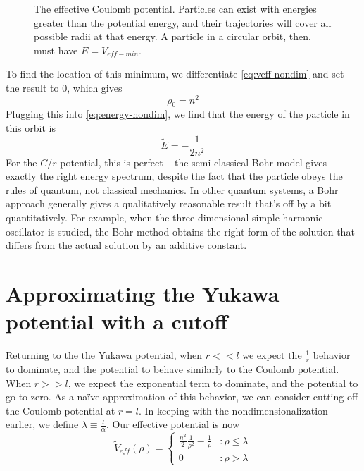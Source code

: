 \documentclass[12pt,twoside]{reedthesis}
\newcommand{\eqn}[1]{\begin{equation}#1\end{equation}}
\begin{document}
\begin{figure}[h]
\caption{The effective Coulomb potential. Particles can exist with energies greater than the potential energy, and their trajectories will cover all possible radii at that energy. A particle in a circular orbit, then, must have $E = V_{eff-min}$.}
\label{fig:hveff}
\end{figure}

To find the location of this minimum, we differentiate \eqref{eq:veff-nondim} and set the result to $0$, which gives
\eqn{
\rho_0 = n^2
\label{eq:rho-n}
}
Plugging this into \eqref{eq:energy-nondim}, we find that the energy of the particle in this orbit is
\eqn{
\tilde{E} = -\frac{1}{2 n^2}
}
For the $C/r$ potential, this is perfect -- the semi-classical Bohr model gives exactly the right energy spectrum, despite the fact that the particle obeys the rules of quantum, not classical mechanics. In other quantum systems, a Bohr approach generally gives a qualitatively reasonable result that's off by a bit quantitatively. For example, when the three-dimensional simple harmonic oscillator is studied, the Bohr method obtains the right form of the solution that differs from the actual solution by an additive constant.

\section{Approximating the Yukawa potential with a cutoff}

Returning to the the Yukawa potential, when $r << l$ we expect the $\frac{1}{r}$ behavior to dominate, and the potential to behave similarly to the Coulomb potential. When $r >> l$, we expect the exponential term to dominate, and the potential to go to zero. As a na\"ive approximation of this behavior, we can consider cutting off the Coulomb potential at $r = l$. In keeping with the nondimensionalization earlier, we define $\lambda \equiv \frac{l}{\alpha}$. Our effective potential is now
\eqn{
\tilde{V}_{eff}(\rho) = \left\{
\begin{array}{lr}
 \frac{n^2}{2}\frac{1}{\rho^2}-\frac{1}{\rho} & : \rho \leq \lambda \\
0 & : \rho > \lambda
\end{array}
\right.
\label{eq:naive}
}
\end{document}
